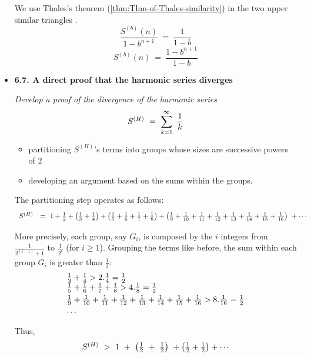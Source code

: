 \begin{itemize}
We use Thales's theorem (\ref{thm:Thm-of-Thales-similarity}) in the two upper similar triangles .
\[ \frac{S^{(b)}(n)}{1-b^{n+1}} \ = \ \frac{1}{1-b} \]
\[ S^{(b)}(n) \ = \ \frac{1-b^{n+1}}{1-b} \]

\medskip

\item
{\bf 6.7. A direct proof that the harmonic series diverges}

{\em Develop a proof of the divergence of the harmonic series 
\[ S^{(H)} \ = \ \sum_{k=1}^\infty \ {1 \over k} \]
\begin{itemize}
\item
partitioning $S^{(H)}$'s terms into groups whose sizes are successive powers of $2$
\item
developing an argument based on the sums within the groups.
\end{itemize}
}

\smallskip

The partitioning step operates as follows:
{\footnotesize
\[ 
\begin{array}{ll}
S^{(H)}   & = \ 1  + {1 \over 2} + \left(  {1 \over 3}   +  {1 \over 4}  \right) + \left( {1 \over 5} + {1 \over 6}+ {1 \over 7}  +  {1 \over 8} \right) + \left( {1 \over 9} + {1 \over 10}+ {1 \over 11}  +{1 \over 12} + {1 \over 13} + {1 \over 14} + {1 \over 15} + {1 \over 16} \right) \ +\cdots
\end{array} \]
}

More precisely, each group, say $G_i$, is composed by the $i$ integers from $\frac{1}{2^{(i-1)}+1}$ to $\frac{1}{2^{i}}$ 
(for $i \geq 1$).
Grouping the terms like before, the sum within each group $G_i$ is greater than $\frac{1}{2}$:
\[ 
\begin{array}{l}
{1 \over 3} + {1 \over 4}  > 2.{1 \over 4} = {1 \over 2} \\ \smallskip
{1 \over 5} + {1 \over 6} + {1 \over 7}+ {1 \over 8}  > 4.{1 \over 8} = {1 \over 2}  \\  \smallskip
{1 \over 9} + {1 \over 10} + {1 \over 11}  +{1 \over 12} + {1 \over 13} + {1 \over 14} + {1 \over 15} + {1 \over 16}  > 8.{1 \over 16} = {1 \over 2}  \\  \smallskip
\cdots
\end{array} \]
Thus, 
\[ 
\begin{array}{ll}
S^{(H)} \ > \ 1 \ + \ \left( {1 \over 2} \ + \ {1 \over 2} \right) \ + \left( {1 \over 2} + {1 \over 2} \right) + \cdots
\end{array} \]
\medskip


\end{itemize}
